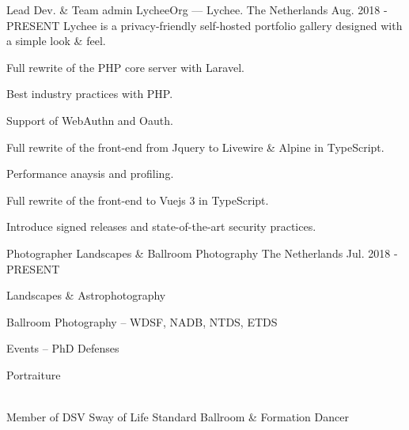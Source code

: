 
\begin{cventries}
	\cventry
	{Lead Dev. \& Team admin} %
	{LycheeOrg --- Lychee.} %
	{The Netherlands} %
	{Aug. 2018 - PRESENT} %
	{Lychee is a privacy-friendly self-hosted portfolio gallery designed with a simple look \& feel.}
	{
		\begin{cvitems}
			\item {Full rewrite of the PHP core server with Laravel.}
			\item {Best industry practices with PHP.}
			\item {Support of WebAuthn and Oauth.}
			\item {Full rewrite of the front-end from Jquery to Livewire \& Alpine in TypeScript.}
			\item {Performance anaysis and profiling.}
			\item {Full rewrite of the front-end to Vuejs 3 in TypeScript.}
			\item {Introduce signed releases and state-of-the-art security practices.\\}
		\end{cvitems}
	}
	\cventry
	{Photographer} %
	{Landscapes \& Ballroom Photography} %
	{The Netherlands} %
	{Jul. 2018 - PRESENT} %
	{
		\begin{cvitems}
			\item {Landscapes \& Astrophotography}
			\item {Ballroom Photography -- WDSF, NADB, NTDS, ETDS}
			\item {Events -- PhD Defenses}
			\item {Portraiture\\~\\}
		\end{cvitems}
	}
	\cventry
	{Member of DSV Sway of Life} %
	{Standard Ballroom \& Formation Dancer} %

\end{cventries}
